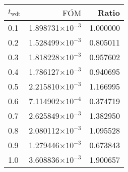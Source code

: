 \begin{tabular}{lrr}
\toprule
$t_{\mathrm{wdt}}$ & $\overline{\mathrm{FOM}}$ &    Ratio \\
\midrule
               0.1 &  1.898731$\times 10^{-3}$ & 1.000000 \\
               0.2 &  1.528499$\times 10^{-3}$ & 0.805011 \\
               0.3 &  1.818228$\times 10^{-3}$ & 0.957602 \\
               0.4 &  1.786127$\times 10^{-3}$ & 0.940695 \\
               0.5 &  2.215810$\times 10^{-3}$ & 1.166995 \\
               0.6 &  7.114902$\times 10^{-4}$ & 0.374719 \\
               0.7 &  2.625849$\times 10^{-3}$ & 1.382950 \\
               0.8 &  2.080112$\times 10^{-3}$ & 1.095528 \\
               0.9 &  1.279446$\times 10^{-3}$ & 0.673843 \\
               1.0 &  3.608836$\times 10^{-3}$ & 1.900657 \\
\bottomrule
\end{tabular}
